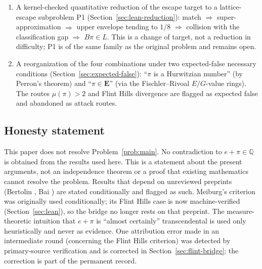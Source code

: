 \documentclass[11pt]{amsart}
\theoremstyle{definition}
\theoremstyle{remark}
\numberwithin{equation}{section}
\newcommand{\Q}{\mathbb{Q}}
\newcommand{\irr}{\mu}
\begin{document}
\begin{enumerate}
\item A kernel-checked quantitative reduction of the escape target to a lattice-escape subproblem P1 (Section~\ref{sec:lean-reduction}): match $\Rightarrow$ super-approximation $\Rightarrow$ upper envelope tending to $1/8$ $\Rightarrow$ collision with the classification gap $\Rightarrow$ $B\pi\in L$. This is a change of target, not a reduction in difficulty; P1 is of the same family as the original problem and remains open.
\item A reorganization of the four combinations under two expected-false necessary conditions (Section~\ref{sec:expected-false}): ``$\pi$ is a Hurwitzian number'' (by Perron's theorem) and ``$\pi\in\mathbf{E}$'' (via the Fischler--Rivoal $E/G$-value rings). The routes $\irr(\pi)>2$ and Flint Hills divergence are flagged as expected false and abandoned as attack routes.
\end{enumerate}

\subsection{Honesty statement} This paper does not resolve Problem~\ref{prob:main}. No contradiction to $e+\pi\in\Q$ is obtained from the results used here. This is a statement about the present arguments, not an independence theorem or a proof that existing mathematics cannot resolve the problem. Results that depend on unreviewed preprints (Bertolin \cite{Bertolin2026}, Bai \cite{Bai2026}) are stated conditionally and flagged as such. Meiburg's criterion \cite{Meiburg2022} was originally used conditionally; its Flint Hills case is now machine-verified (Section~\ref{sec:lean}), so the bridge no longer rests on that preprint. The measure-theoretic intuition that $e+\pi$ is ``almost certainly'' transcendental is used only heuristically and never as evidence. One attribution error made in an intermediate round (concerning the Flint Hills criterion) was detected by primary-source verification and is corrected in Section~\ref{sec:flint-bridge}; the correction is part of the permanent record.
\end{document}
